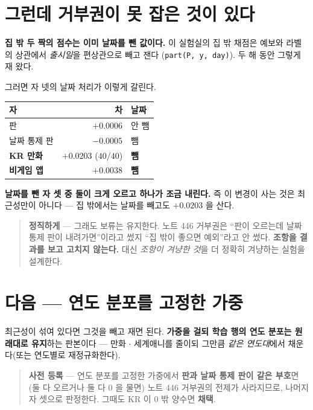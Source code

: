 \documentclass[11pt]{article}
\begin{document}
\section{그런데 거부권이 못 잡은 것이 있다}

\textbf{집 밖 두 짝의 점수는 이미 날짜를 뺀 값이다.} 이 실험실의 집 밖
채점은 예보와 라벨의 상관에서 \emph{출시일}을 편상관으로 빼고 잰다
(\texttt{part(P, y, day)}). 두 해 동안 그렇게 재 왔다.

그러면 자 넷의 날짜 처리가 이렇게 갈린다.

\begin{center}
\begin{tabular}{lrl}
\hline
자 & 차 & 날짜 \\
\hline
판 & $+0.0006$ & 안 뺌 \\
날짜 통제 판 & $-0.0005$ & 뺌 \\
\textbf{KR 만화} & $\mathbf{+0.0203}$ ($40/40$) & \textbf{뺌} \\
\textbf{비게임 앱} & $\mathbf{+0.0038}$ & \textbf{뺌} \\
\hline
\end{tabular}
\end{center}

\textbf{날짜를 뺀 자 셋 중 둘이 크게 오르고 하나가 조금 내린다.} 즉 이
변경이 사는 것은 최근성만이 아니다 --- 집 밖에서는 날짜를 빼고도
$+0.0203$ 을 산다.

\begin{quote}
\textbf{정직하게} --- 그래도 보류는 유지한다. 노트 446 거부권은 ``판이
오르는데 날짜 통제 판이 내려가면''이라고 썼지 ``집 밖이 좋으면
예외''라고 안 썼다. \textbf{조항을 결과를 보고 고치지 않는다.} 대신
\emph{조항이 겨냥한 것}을 더 정확히 겨냥하는 실험을 설계한다.
\end{quote}

\section{다음 --- 연도 분포를 고정한 가중}

최근성이 섞여 있다면 그것을 빼고 재면 된다. \textbf{가중을 걸되 학습 행의
연도 분포는 원래대로 유지}하는 판본이다 --- 만화 $\cdot$ 세계애니를 줄이되
그만큼 \emph{같은 연도대}에서 채운다(또는 연도별로 재정규화한다).

\begin{quote}
\textbf{사전 등록} --- 연도 분포를 고정한 가중에서 \textbf{판과 날짜 통제
판이 같은 부호}면(둘 다 오르거나 둘 다 $0$ 을 물면) 노트 446 거부권의
전제가 사라지므로, 나머지 자 셋으로 판정한다. 그때도 KR 이 $0$ 밖 양수면
\textbf{채택}.
\end{quote}
\end{document}
